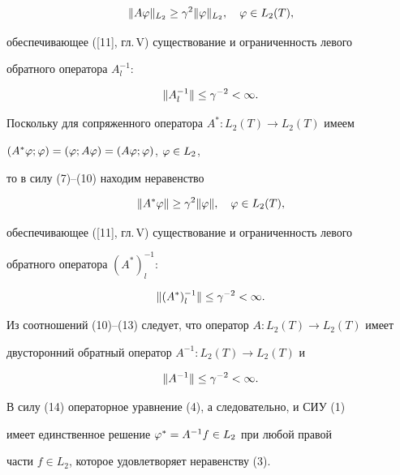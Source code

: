 \begin{pf}
\begin{equation}


\|A\vp\|_{L_2}\gea \gamma^2\|\vp\|_{L_2},\quad \vp \in L_2(T),


\end{equation}


обеспечивающее ([11], гл.\,V) существование и ограниченность левого 


обратного оператора $A_l^{-1}$:


\begin{equation}


\|A_l^{-1}\|\lea \gamma^{-2}<\infty.


\end{equation}


Поскольку для сопряженного оператора $A^*:L_2(T)\to L_2(T)$ имеем


$(A^*\varphi;\varphi) = (\varphi;A\varphi) = (A\varphi;\varphi)$, $\varphi\in L_2$,


то в силу (7)--(10) находим неравенство


\begin{equation}


\|A^*\vp\| \gea \gamma^2\|\vp\|,\quad \vp\in L_2(T),


\end{equation}


обеспечивающее ([11], гл.\,V) существование и ограниченность левого 


обратного оператора $(A^*)_l^{-1}$:


\begin{equation}


\|(A^*)_l^{-1}\|\lea \gamma^{-2}<\infty.


\end{equation}


Из соотношений (10)--(13) следует, что оператор $A:L_2(T)\to L_2(T)$ имеет 


двусторонний обратный оператор $A^{-1}:L_2(T)\to L_2(T)$ и


\begin{equation}


\|A^{-1}\|\lea \gamma^{-2}<\infty.


\end{equation}





В силу (14) операторное уравнение (4), а следовательно, и СИУ (1) 


имеет единственное решение $\varphi^* = A^{-1}f\in L_2$ при любой правой 


части $f\in L_2$, которое удовлетворяет неравенству (3).


\end{pf}








